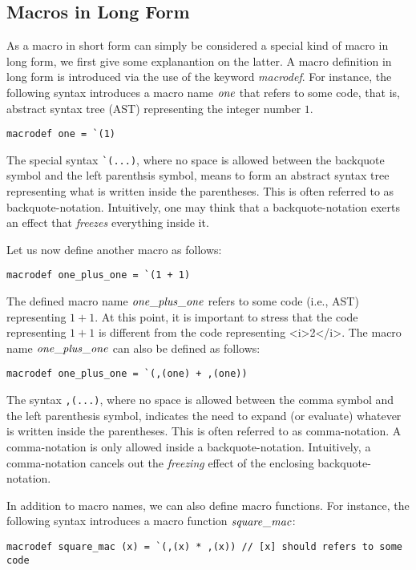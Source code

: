 \subsection{Macros in Long Form}
As a macro in short form can simply be considered a special kind of macro
in long form, we first give some explanantion on the latter.  A macro
definition in long form is introduced via the use of the keyword
{\it macrodef}. For instance, the following syntax introduces a macro name
${\it one}$ that refers to some code, that is, abstract syntax tree (AST)
representing the integer number $1$.
\begin{verbatim}
macrodef one = `(1)
\end{verbatim}

The special syntax \verb'`(...)', where no space is allowed between the
backquote symbol and the left parenthsis symbol, means to form an abstract
syntax tree representing what is written inside the parentheses.  This is
often referred to as backquote-notation. Intuitively, one may think that a
backquote-notation exerts an effect that {\it freezes} everything inside it.

Let us now define another macro as follows:
\begin{verbatim}
macrodef one_plus_one = `(1 + 1)
\end{verbatim}
The defined macro name ${\it one\_plus\_one}$ refers to some code (i.e.,
AST) representing $1 + 1$. At this point, it is important to stress that
the code representing $1 + 1$ is different from the code representing
<i>2</i>.  The macro name ${\it one\_plus\_one}$ can also be defined as
follows:
\begin{verbatim}
macrodef one_plus_one = `(,(one) + ,(one))
\end{verbatim}

The syntax \verb',(...)', where no space is allowed between the comma
symbol and the left parenthesis symbol, indicates the need to expand (or
evaluate) whatever is written inside the parentheses. This is often
referred to as comma-notation. A comma-notation is only allowed inside a
backquote-notation. Intuitively, a comma-notation cancels out the {\it
freezing} effect of the enclosing backquote-notation.

In addition to macro names, we can also define macro functions. For
instance, the following syntax introduces a macro function
${\it square\_mac}$:
\begin{verbatim}
macrodef square_mac (x) = `(,(x) * ,(x)) // [x] should refers to some code
\end{verbatim}


